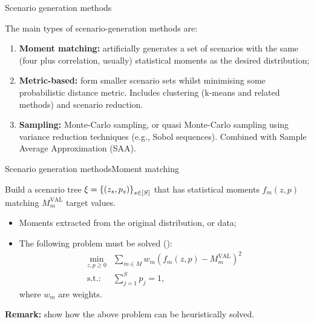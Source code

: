 \begin{frame}{Scenario generation methods}

	The main types of scenario-generation methods are:
	\begin{enumerate}[<+->]
		\item {\bf Moment matching:} artificially \alert{generates} a set of scenarios with the \alert{same} (four plus correlation, usually) \alert{statistical moments} as the desired distribution;
		\item {\bf Metric-based:} form \alert{smaller} scenario sets whilst \alert{minimising} some probabilistic distance metric. Includes clustering (k-means and related methods) and scenario reduction. %
		\item {\bf Sampling:} \alert{Monte-Carlo sampling}, or quasi Monte-Carlo sampling using variance reduction techniques (e.g., Sobol sequences). Combined with Sample Average Approximation (SAA). 
	\end{enumerate}

	
\end{frame}

\begin{frame}{Scenario generation methods}{Moment matching}

	Build a scenario tree $\xi = \left\{ (z_s,p_s) \right \}_{s \in [S]}$ that has \alert{statistical moments} $f_m(z,p)$ matching $M^{\text{VAL}}_m$ \alert{target} values.
	
	\begin{itemize}
		\item<2-> Moments extracted from the original distribution, or data;
		\item<3-> The following problem must be solved ({\small \cite{hoyland2001generating}}):
		\begin{equation*}
			\begin{aligned}
				\min_{z, p \ge 0} & \sum_{m \in M} w_m(f_m(z,p) - M^{\text{VAL}}_m)^2 \\
				\text{s.t.:~} & \sum_{j=1}^{S} p_j = 1,	
			\end{aligned}
		\end{equation*}
		where $w_m$ are weights.
	\end{itemize}
	
	{\onslide<3->
	
	{\bf Remark:} \small \cite{hoyland2003heuristic} show how the above problem can be \alert{heuristically} solved.
	}
\end{frame}

